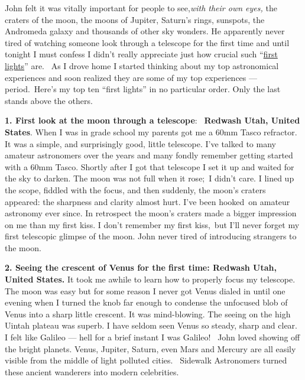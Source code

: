 John felt it was vitally important for people to see,\emph{with their
own eyes,} the craters of the moon, the moons of Jupiter, Saturn's
rings, sunspots, the Andromeda galaxy and thousands of other sky
wonders. He apparently never tired of watching someone look through a
telescope for the first time and until tonight I must confess I didn't
really appreciate just how crucial such
``\href{https://en.wikipedia.org/wiki/First\_light\_(astronomy)}{first
lights}'' are. ~As I drove home I started thinking about my top
astronomical experiences and soon realized they are some of my top
experiences --- period.~Here's my top ten ``first lights'' in no
particular order. Only the last stands above the others.

\medskip

\textbf{1. First look at the moon through a telescope}:~ \textbf{Redwash
Utah, United States}. When I was in grade school my parents got me a
60mm Tasco refractor. It was a simple, and surprisingly good, little
telescope. I've talked to many amateur astronomers over the years and
many fondly remember getting started with a 60mm Tasco. Shortly after I
got that telescope I set it up and waited for the sky to darken. The
moon was not full when it rose;~I didn't care. I lined up the scope,
fiddled with the focus, and then suddenly, the moon's craters appeared:
the sharpness and clarity almost hurt. I've been hooked~on amateur
astronomy ever since. In retrospect the moon's craters made a bigger
impression on me than my first kiss. I don't remember my first kiss,~but
I'll never forget my first telescopic glimpse of the moon. John never
tired of introducing strangers to the moon.

\medskip

\textbf{2. Seeing the crescent of Venus for the first time: Redwash
Utah, United States.} It took me awhile to learn how to properly focus my
telescope. The moon was easy but for some reason I never got Venus
dialed in until one evening when I turned the knob far enough to
condense the unfocused blob of Venus into a sharp little crescent. It
was mind-blowing. The seeing on the high Uintah plateau was superb. I
have seldom seen Venus so steady, sharp and clear. I felt like Galileo
--- hell for a brief instant I was Galileo! ~John loved showing off the
bright planets. Venus, Jupiter, Saturn, even Mars and Mercury are all
easily visible from the middle of light polluted cities. ~Sidewalk
Astronomers turned these ancient wanderers into modern celebrities.

\medskip

